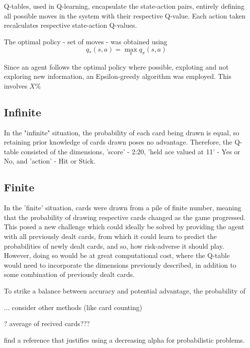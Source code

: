 \smallskip
Q-tables, used in Q-learning, encapsulate the state-action pairs, entirely defining all possible moves in the system with their respective Q-value. Each action taken recalculates respective state-action Q-values. 

\smallskip
The optimal policy - set of moves - was obtained using 
\begin{equation}
    q_*(s,a) = \max_{\pi}q_{\pi}(s,a)
\end{equation}

Since an agent follows the optimal policy where possible, exploting  and not exploring new information, an Epsilon-greedy algorithm was employed. This involves    \(X\%\)

\subsection{Infinite}

In the "infinite" situation, the probability of each card being drawn is equal, so retaining prior knowledge of cards drawn poses no advantage. Therefore, the Q-table consisted of the dimensions, 'score' - 2:20, 'held ace valued at 11' - Yes or No, and 'action' - Hit or Stick.


\subsection{Finite}

In the 'finite' situation, cards were drawn from a pile of finite number, meaning that the probability of drawing respective cards changed as the game progressed. This posed a new challenge which could ideally be solved by providing the agent with all previously dealt cards, from which it could learn to predict the probabilities of newly dealt cards, and so, how risk-adverse it should play. However, doing so would be at great computational cost, where the Q-table would need to incorporate the dimensions previously described, in addition to some combination of previously dealt cards. 

To strike a balance between accuracy and potential advantage, the probability of 

... consider other methods (like card counting)

? average of recived cards???

find a reference that justifies using a decreasing alpha for probabilistic problems. 
